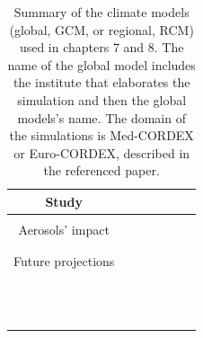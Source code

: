 \begin{table}[h!]
  \begin{tabular}{c|>{\raggedrigth}m{1cm}>{\raggedright}m{2cm}>{\raggedright}m{2cm}>{\raggedright}m{2cm}>{\raggedright}m{1.5cm}>{\raggedright}m{3cm}}
    \toprule 
    Study & \centering{Climate Model}  & &  \tabularnewline
    \midrule                                                         
    & \centering{GCM} & \centering{RCM} & \centering{Domain} & \centering{Resolution RCM} &\centering{Simulation} \tabularnewline                                            
    \midrule
     Aerosols' impact & \centering{CNRM-CM5} & \centering{CNRM-ALADIN53} & \centering{Med-CORDEX} & \centering{0.44º} & \centering{AER}\midrule\\
    \centering{NO-AER}\midrule\\
    \centering{TREND}
    \tabularnewline
   \midrule
    Future projections & \centering{CNRM-CM5} & \centering{ALADIN53}\midrule\\
    \centering{RCA4}\midrule\\
    \centering{CCLM4}\midrule & \centering{Euro-CORDEX} & \centering{0.11º} & \centering{HIST/RCP8.5}\\
    \centering{HIST/RCP8.5}\\
    \centering{HIST/RCP8.5}
    \tabularnewline
          & \centering{EC-EARTH} & \centering{RACMO}\midrule\\
    \centering{RCA4}\midrule\\
    \centering{CCLM4}\midrule & \centering{Euro-CORDEX} & \centering{0.11º} & \centering{HIST/RCP8.5}\\
    \centering{HIST/RCP8.5}\\
    \centering{HIST/RCP8.5}
    \tabularnewline
          & \centering{CNRM-CM5} & \centering{ALADIN-RCSM4}\midrule\\
    \centering{PROTHEUS}\midrule & \centering{Med-CORDEX} & \centering{0.44º} & \centering{HIST/RCP4.5}\\
    \centering{HIST/RCP4.5}
    \tabularnewline
 \bottomrule
  \end{tabular}
  \caption[Summary of the climate models (global, GCM, or regional, RCM) used in chapters 7 and 8]{Summary of the climate models (global, GCM, or regional, RCM) used in chapters 7 and 8. The name of the global model includes the institute that elaborates the simulation and then the global models's name. The domain of the simulations is Med-CORDEX or Euro-CORDEX, described in the referenced paper.}
  \label{climatemodels}
\end{table}
 

